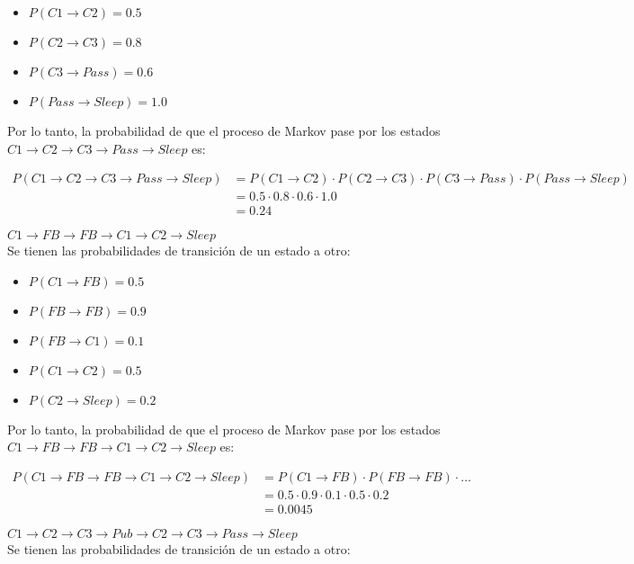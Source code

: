 \begin{itemize}
    \item $P(C1 \rightarrow C2) = 0.5$
    \item $P(C2 \rightarrow C3) = 0.8$
    \item $P(C3 \rightarrow Pass) = 0.6$
    \item $P(Pass \rightarrow Sleep) = 1.0$
\end{itemize}

Por lo tanto, la probabilidad de que el proceso de Markov pase por los estados $C1 \rightarrow C2 \rightarrow C3 \rightarrow Pass \rightarrow Sleep$ es:

\begin{align*}
    P(C1 \rightarrow C2 \rightarrow C3 \rightarrow Pass \rightarrow Sleep) & = P(C1 \rightarrow C2) \cdot P(C2 \rightarrow C3) \cdot P(C3 \rightarrow Pass) \cdot P(Pass \rightarrow Sleep)\\
    &= 0.5 \cdot 0.8 \cdot 0.6 \cdot 1.0\\
    &= 0.24
\end{align*}

\indent$C1 \rightarrow FB \rightarrow FB \rightarrow C1 \rightarrow C2 \rightarrow Sleep$\\
Se tienen las probabilidades de transición de un estado a otro:

\begin{itemize}
    \item $P(C1 \rightarrow FB) = 0.5$
    \item $P(FB \rightarrow FB) = 0.9$
    \item $P(FB \rightarrow C1) = 0.1$
    \item $P(C1 \rightarrow C2) = 0.5$
    \item $P(C2 \rightarrow Sleep) = 0.2$
\end{itemize}

Por lo tanto, la probabilidad de que el proceso de Markov pase por los estados $C1 \rightarrow FB \rightarrow FB \rightarrow C1 \rightarrow C2 \rightarrow Sleep$ es:

\begin{align*}
    P(C1 \rightarrow FB \rightarrow FB \rightarrow C1 \rightarrow C2 \rightarrow Sleep) & = P(C1 \rightarrow FB) \cdot P(FB \rightarrow FB) \cdot \ldots \\
    &= 0.5 \cdot 0.9 \cdot 0.1 \cdot 0.5 \cdot 0.2\\
    &= 0.0045
\end{align*}

\indent$C1 \rightarrow C2 \rightarrow C3 \rightarrow Pub \rightarrow C2 \rightarrow C3 \rightarrow Pass \rightarrow Sleep$\\
Se tienen las probabilidades de transición de un estado a otro:

